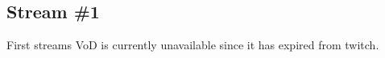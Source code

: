 \subsection{Stream \#1}

First streams VoD is currently unavailable since it has expired from twitch.